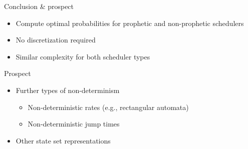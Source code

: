 \documentclass[aspectratio=169]{beamer}
\begin{document}
\begin{frame}{Conclusion \& prospect}

\begin{itemize}
  \item Compute optimal probabilities for prophetic and non-prophetic schedulers
  \item No discretization required
  \item Similar complexity for both scheduler types
\end{itemize}

\bigskip

Prospect
\begin{itemize}
  \item Further types of non-determinism
  \begin{itemize}
    \item Non-deterministic rates (e.g., rectangular automata)
    \item Non-deterministic jump times
  \end{itemize}
  \item Other state set representations
\end{itemize}

\end{frame}

\end{document}
